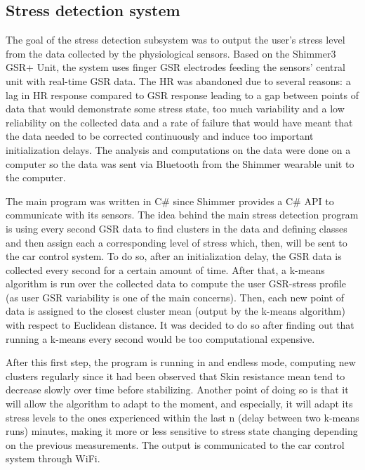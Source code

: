 \subsection{Stress detection system}\label{sec:design_system_stress}

The goal of the stress detection subsystem was to output the user's stress
level from the data collected by the physiological sensors. Based on the
Shimmer3 GSR+ Unit, the system uses finger GSR electrodes feeding the sensors'
central unit with real-time GSR data. The HR was abandoned due to several
reasons: a lag in HR response compared to GSR response leading to a gap
between points of data that would demonstrate some stress state, too much
variability and a low reliability on the collected data and a rate of failure
that would have meant that the data needed to be corrected continuously and
induce too important initialization delays. The analysis and computations
on the data were done on a computer so the data was sent via Bluetooth from
the Shimmer wearable unit to the computer.

The main program was written in C\# since Shimmer provides a C\# API to
communicate with its sensors.  The idea behind the main stress detection
program is using every second GSR data to find clusters in the data and
defining classes and then assign each a corresponding level of stress which,
then, will be sent to the car control system. To do so, after an initialization
delay, the GSR data is collected every second for a certain amount of time.
After that, a k-means algorithm is run over the collected data to compute
the user GSR-stress profile (as user GSR variability is one of the main
concerns). Then, each new point of data is assigned to the closest cluster
mean (output by the k-means algorithm) with respect to Euclidean distance. It
was decided to do so after finding out that running a k-means every second
would be too computational expensive.

After this first step, the program is running in and endless mode, computing
new clusters regularly since it had been observed that Skin resistance mean
tend to decrease slowly over time before stabilizing. Another point of doing
so is that it will allow the algorithm to adapt to the moment, and especially,
it will adapt its stress levels to the ones experienced within the last n
(delay between two k-means runs) minutes, making it more or less sensitive
to stress state changing depending on the previous measurements. The output
is communicated to the car control system through WiFi.

